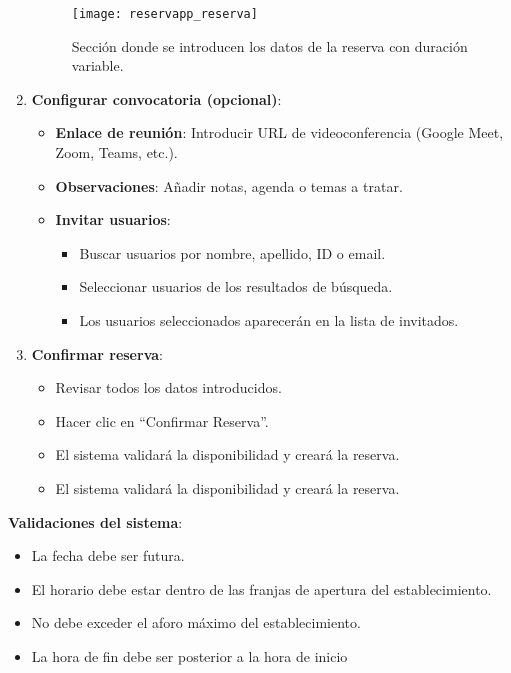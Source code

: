 \begin{enumerate}
   \begin{figure}[H]
	\centering
		\texttt{[image: reservapp\_reserva]}
	\caption{Sección donde se introducen los datos de la reserva con duración variable.}
	\label{fig:reservapp_reserva}
   \end{figure}

   \item \textbf{Configurar convocatoria (opcional)}:
   \begin{itemize}
      \item \textbf{Enlace de reunión}: Introducir URL de videoconferencia (Google Meet, Zoom, Teams, etc.).
      \item \textbf{Observaciones}: Añadir notas, agenda o temas a tratar.
      \item \textbf{Invitar usuarios}:
      \begin{itemize}
         \item Buscar usuarios por nombre, apellido, ID o email.
         \item Seleccionar usuarios de los resultados de búsqueda.
         \item Los usuarios seleccionados aparecerán en la lista de invitados.
      \end{itemize}
   \end{itemize}
   \item \textbf{Confirmar reserva}:
   \begin{itemize}
      \item Revisar todos los datos introducidos.
      \item Hacer clic en ``Confirmar Reserva''.
      \item El sistema validará la disponibilidad y creará la reserva.
      \item El sistema validará la disponibilidad y creará la reserva.
   \end{itemize}
\end{enumerate}

\textbf{Validaciones del sistema}:
\begin{itemize}
   \item La fecha debe ser futura.
   \item El horario debe estar dentro de las franjas de apertura del establecimiento.
   \item No debe exceder el aforo máximo del establecimiento.
   \item La hora de fin debe ser posterior a la hora de inicio
\end{itemize}
